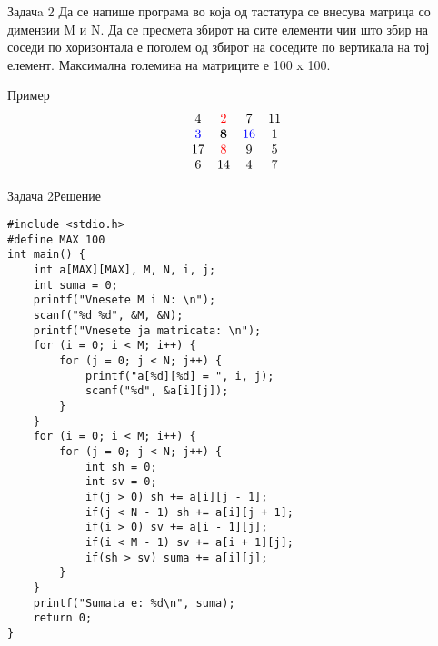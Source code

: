\begin{frame}{Задачa 2}
Да се напише програма во која од тастатура се внесува матрица со димензии M и
N. Да се пресмета збирот на сите елементи чии што збир на соседи по хоризонтала
е поголем од збирот на соседите по вертикала на тој елемент. Максимална големина
на матриците е 100 x 100.
\begin{exampleblock}{Пример}
\[
 \begin{matrix}
  4 & \color{red}{2} & 7 & 11 \\
  \color{blue}{3} & \textbf{8} & \color{blue}{16} & 1 \\
  17 & \color{red}{8} & 9 & 5 \\
  6 & 14 & 4 & 7
 \end{matrix}
\]
\end{exampleblock}
\end{frame}

\begin{frame}[fragile,shrink=5]{Задача 2}{Решение}
\begin{lstlisting}
#include <stdio.h>
#define MAX 100
int main() {
    int a[MAX][MAX], M, N, i, j;
    int suma = 0;
    printf("Vnesete M i N: \n");
    scanf("%d %d", &M, &N);
    printf("Vnesete ja matricata: \n");
    for (i = 0; i < M; i++) {
        for (j = 0; j < N; j++) {
            printf("a[%d][%d] = ", i, j);
            scanf("%d", &a[i][j]);
        }
    }
    for (i = 0; i < M; i++) {
        for (j = 0; j < N; j++) {
            int sh = 0;
            int sv = 0;
            if(j > 0) sh += a[i][j - 1];
            if(j < N - 1) sh += a[i][j + 1];
            if(i > 0) sv += a[i - 1][j];
            if(i < M - 1) sv += a[i + 1][j];
            if(sh > sv) suma += a[i][j];
        }
    }
    printf("Sumata e: %d\n", suma);
    return 0;
}
\end{lstlisting}
\end{frame}

